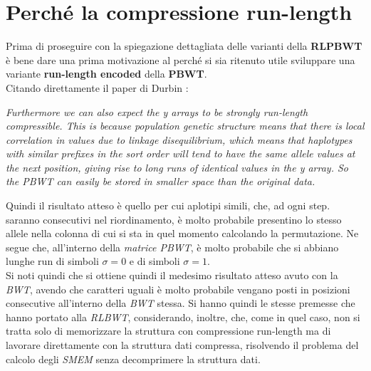 \section{Perché la compressione run-length}
Prima di proseguire con la spiegazione dettagliata delle varianti della
\textbf{RLPBWT} è bene dare 
una prima motivazione al perché si sia ritenuto utile sviluppare una variante
\textbf{run-length encoded} della \textbf{PBWT}.\\
Citando direttamente il paper di Durbin \cite{pbwt}:
\begin{center}
  \textit{Furthermore we can also expect the y arrays to be strongly run-length
    compressible. This is because population genetic structure means that there
    is local correlation in values due to linkage disequilibrium, which means
    that haplotypes with similar prefixes in the sort order will tend to have
    the same allele values at the next position, giving rise to long runs of
    identical values in the y array. So the PBWT can easily be stored in smaller
    space than the original data.} 
\end{center}
Quindi il risultato atteso è quello per cui aplotipi simili, che, ad ogni step.
saranno consecutivi nel riordinamento, è molto probabile presentino lo stesso
allele nella colonna di cui si sta in quel momento calcolando la
permutazione. Ne segue che, all'interno della \textit{matrice PBWT}, è molto
probabile che si abbiano lunghe run di simboli $\sigma=0$ e di simboli
$\sigma=1$.\\ 
Si noti quindi che si ottiene quindi il medesimo risultato atteso avuto con
la \textit{BWT}, avendo che caratteri uguali è molto probabile vengano posti in
posizioni consecutive all'interno della \textit{BWT} stessa. Si hanno quindi le
stesse premesse che hanno portato alla \textit{RLBWT}, considerando, inoltre,
che,
come in quel caso, non si tratta solo di memorizzare la struttura con
compressione run-length ma di lavorare direttamente con la struttura dati
compressa, risolvendo il problema del calcolo degli \textit{SMEM} senza
decomprimere la struttura dati.
